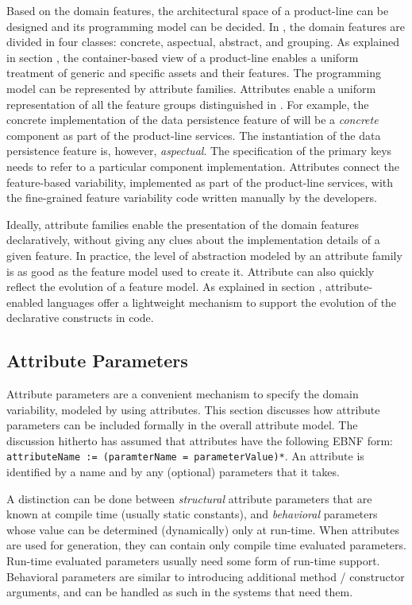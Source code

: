 Based on the domain features, the architectural space of a product-line can be designed and its programming model can be decided. In \cite{generative.00}, the domain features are divided in four classes: concrete, aspectual, abstract, and grouping. As explained in section , the container-based view of a product-line enables a uniform treatment of generic and specific assets and their features. The programming model can be represented by attribute families. Attributes enable a uniform representation of all the feature groups distinguished in \cite{generative.00}. For example, the concrete implementation of the data persistence feature of  will be a \textit{concrete} component as part of the product-line services. The instantiation of the data persistence feature is, however, \textit{aspectual}. The specification of the primary keys needs to refer to a particular component implementation. Attributes connect the feature-based variability, implemented as part of the product-line services, with the fine-grained feature variability code written manually by the developers.

Ideally, attribute families enable the presentation of the domain features declaratively, without giving any clues about the implementation details of a given feature. In practice, the level of abstraction modeled by an attribute family is as good as the feature model used to create it. Attribute can also quickly reflect the evolution of a feature model. As explained in section , attribute-enabled languages offer a lightweight mechanism to support the evolution of the declarative constructs in code. 

\subsection{Attribute Parameters}
\label{ch03:sec:attrib.param}

Attribute parameters are a convenient mechanism to specify the domain variability, modeled by using attributes. This section discusses how attribute parameters can be included formally in the overall attribute model. The discussion hitherto has assumed that attributes have the following EBNF \cite{Parsing.Techniques.90} form: {\tt attributeName :=\- (paramterName =\- pa\-ra\-me\-terVa\-lue)*}. An attribute is identified by a name and by any (optional) parameters that it takes.

A distinction can be done between \textit{structural} attribute parameters that are known at compile time (usually static constants), and \textit{behavioral} parameters whose value can be determined (dynamically) only at run-time. When attributes are used for generation, they can contain only compile time evaluated parameters. Run-time evaluated parameters usually need some form of run-time support. Behavioral parameters are similar to introducing additional method / constructor arguments, and can be handled as such in the systems that need them.

